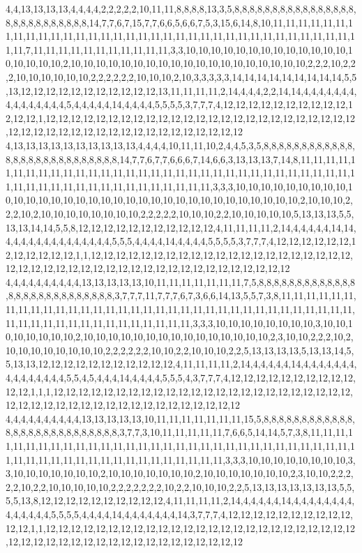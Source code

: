 4,4,13,13,13,13,4,4,4,4,2,2,2,2,2,10,11,11,8,8,8,8,13,3,5,8,8,8,8,8,8,8,8,8,8,8,8,8,8,8,8,8,8,8,8,8,8,8,8,8,8,8,14,7,7,6,7,15,7,7,6,6,5,6,6,7,5,3,15,6,14,8,10,11,11,11,11,11,11,11,11,11,11,11,11,11,11,11,11,11,11,11,11,11,11,11,11,11,11,11,11,11,11,11,11,11,11,11,11,7,11,11,11,11,11,11,11,11,11,11,11,3,3,10,10,10,10,10,10,10,10,10,10,10,10,10,10,10,10,10,10,2,10,10,10,10,10,10,10,10,10,10,10,10,10,10,10,10,10,10,10,2,2,2,10,2,2,2,10,10,10,10,10,10,2,2,2,2,2,2,10,10,10,2,10,3,3,3,3,3,14,14,14,14,14,14,14,14,14,5,5,13,12,12,12,12,12,12,12,12,12,12,12,13,11,11,11,11,2,14,4,4,4,2,2,14,14,4,4,4,4,4,4,4,4,4,4,4,4,4,4,4,5,4,4,4,4,4,14,4,4,4,4,5,5,5,5,3,7,7,7,4,12,12,12,12,12,12,12,12,12,12,12,12,12,1,12,12,12,12,12,12,12,12,12,12,12,12,12,12,12,12,12,12,12,12,12,12,12,12,12,12,12,12,12,12,12,12,12,12,12,12,12,12,12,12,12,12,12,12
4,13,13,13,13,13,13,13,13,13,13,4,4,4,4,10,11,11,10,2,4,4,5,3,5,8,8,8,8,8,8,8,8,8,8,8,8,8,8,8,8,8,8,8,8,8,8,8,8,8,8,8,14,7,7,6,7,7,6,6,6,7,14,6,6,3,13,13,13,7,14,8,11,11,11,11,11,11,11,11,11,11,11,11,11,11,11,11,11,11,11,11,11,11,11,11,11,11,11,11,11,11,11,11,11,11,11,11,11,11,11,11,11,11,11,11,11,11,11,11,11,3,3,3,10,10,10,10,10,10,10,10,10,10,10,10,10,10,10,10,10,10,10,10,10,10,10,10,10,10,10,10,10,10,10,10,10,2,10,10,10,2,2,2,10,2,10,10,10,10,10,10,10,10,2,2,2,2,2,10,10,10,2,2,10,10,10,10,10,5,13,13,13,5,5,13,13,14,14,5,5,8,12,12,12,12,12,12,12,12,12,12,12,4,11,11,11,11,2,14,4,4,4,4,4,14,14,4,4,4,4,4,4,4,4,4,4,4,4,4,4,5,5,5,4,4,4,4,14,4,4,4,4,5,5,5,5,3,7,7,7,4,12,12,12,12,12,12,12,12,12,12,12,12,1,1,12,12,12,12,12,12,12,12,12,12,12,12,12,12,12,12,12,12,12,12,12,12,12,12,12,12,12,12,12,12,12,12,12,12,12,12,12,12,12,12,12,12,12,12
4,4,4,4,4,4,4,4,4,4,13,13,13,13,13,10,11,11,11,11,11,11,11,7,5,8,8,8,8,8,8,8,8,8,8,8,8,8,8,8,8,8,8,8,8,8,8,8,8,8,8,8,3,7,7,7,11,7,7,7,6,7,3,6,6,14,13,5,5,7,3,8,11,11,11,11,11,11,11,11,11,11,11,11,11,11,11,11,11,11,11,11,11,11,11,11,11,11,11,11,11,11,11,11,11,11,11,11,11,11,11,11,11,11,11,11,11,11,11,11,11,3,3,3,10,10,10,10,10,10,10,10,3,10,10,10,10,10,10,10,10,2,10,10,10,10,10,10,10,10,10,10,10,10,10,10,10,2,3,10,10,2,2,2,10,2,10,10,10,10,10,10,10,10,2,2,2,2,2,2,10,10,2,2,10,10,10,2,2,5,13,13,13,13,5,13,13,14,5,5,13,13,12,12,12,12,12,12,12,12,12,12,12,4,11,11,11,11,2,14,4,4,4,4,4,14,4,4,4,4,4,4,4,4,4,4,4,4,4,4,4,5,5,4,5,4,4,4,14,4,4,4,4,5,5,5,4,3,7,7,7,4,12,12,12,12,12,12,12,12,12,12,12,12,1,1,1,12,12,12,12,12,12,12,12,12,12,12,12,12,12,12,12,12,12,12,12,12,12,12,12,12,12,12,12,12,12,12,12,12,12,12,12,12,12,12,12,12,12,12
4,4,4,4,4,4,4,4,4,4,13,13,13,13,13,10,11,11,11,11,11,11,11,15,5,8,8,8,8,8,8,8,8,8,8,8,8,8,8,8,8,8,8,8,8,8,8,8,8,8,8,8,3,7,7,3,10,11,11,11,11,11,7,6,6,5,14,14,5,7,3,8,11,11,11,11,11,11,11,11,11,11,11,11,11,11,11,11,11,11,11,11,11,11,11,11,11,11,11,11,11,11,11,11,11,11,11,11,11,11,11,11,11,11,11,11,11,11,11,11,11,3,3,3,10,10,10,10,10,10,10,10,3,3,10,10,10,10,10,10,10,2,10,10,10,10,10,10,10,2,10,10,10,10,10,10,10,2,3,10,10,2,2,2,2,2,10,2,2,10,10,10,10,10,2,2,2,2,2,2,2,10,2,2,10,10,10,2,2,5,13,13,13,13,13,13,13,5,5,5,5,13,8,12,12,12,12,12,12,12,12,12,12,4,11,11,11,11,2,14,4,4,4,4,4,14,4,4,4,4,4,4,4,4,4,4,4,4,4,4,5,5,5,5,4,4,4,4,14,4,4,4,4,4,4,4,14,3,7,7,7,4,12,12,12,12,12,12,12,12,12,12,12,12,1,1,12,12,12,12,12,12,12,12,12,12,12,12,12,12,12,12,12,12,12,12,12,12,12,12,12,12,12,12,12,12,12,12,12,12,12,12,12,12,12,12,12,12,12,12
